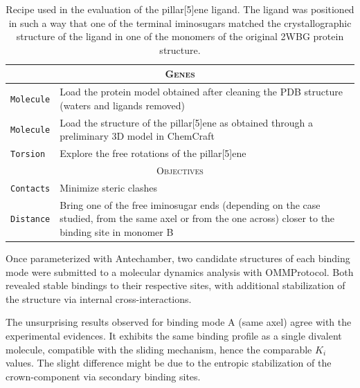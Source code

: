 \begin{table}[hbtp]
	\caption[Pillar-5-ene recipe]{Recipe used in the evaluation of the pillar[5]ene ligand. The ligand was positioned in such a way that one of the terminal iminosugars matched the crystallographic structure of the ligand in one of the monomers of the original 2WBG protein structure.}
	\label{table:recipe-rotaxane}
	\footnotesize
	\newcommand{\tableheading}[1]{\multicolumn{2}{c}{\textsc{#1}}}
	\begin{tabularx}{\textwidth}{RL}
		\toprule
		\tableheading{Genes}\\
		\toprule
		\texttt{Molecule} & Load the protein model obtained after cleaning the PDB structure\cite{pdb:2wbg} (waters and ligands removed) \\
		\midrule
		\texttt{Molecule} & Load the structure of the pillar[5]ene as obtained through a preliminary 3D model in ChemCraft \\
		\midrule
		\texttt{Torsion} & Explore the free rotations of the pillar[5]ene \\
		\toprule
		\tableheading{Objectives}\\
		\toprule
		\texttt{Contacts} & Minimize steric clashes \\
		\midrule
		\texttt{Distance} & Bring one of the free iminosugar ends (depending on the case studied, from the same axel or from the one across) closer to the binding site in monomer B \\

		\bottomrule

	\end{tabularx}
\end{table}

Once parameterized with Antechamber,\cite{wang2001antechamber} two candidate structures of each binding mode were submitted to a molecular dynamics analysis with OMMProtocol. Both revealed stable bindings to their respective sites, with additional stabilization of the structure via internal cross-interactions.

The unsurprising results observed for binding mode A (same axel) agree with the experimental evidences. It exhibits the same binding profile as a single divalent molecule, compatible with the sliding mechanism, hence the comparable $K_{i}$ values. The slight difference might be due to the entropic stabilization of the crown-component via secondary binding sites.

